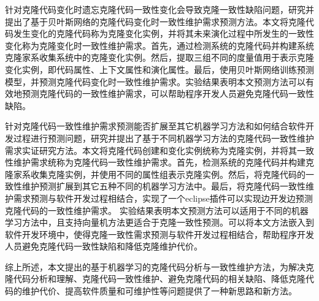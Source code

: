 {%
针对克隆代码变化时遗忘克隆代码一致性变化会导致克隆一致性缺陷问题，研究并提出了基于贝叶斯网络的克隆代码变化时一致性维护需求预测方法。本文将克隆代码发生变化的克隆代码称为克隆变化实例，并将其未来演化过程中所发生的一致性变化称为克隆变化时一致性维护需求。首先，通过检测系统的克隆代码并构建系统克隆家系收集系统中的克隆变化实例。然后，提取三组不同的度量值用于表示克隆变化实例，即代码属性、上下文属性和演化属性。最后，使用贝叶斯网络训练预测模型，并预测克隆代码变化时一致性维护需求。实验结果表明本文预测方法可以有效地预测克隆代码的一致性维护需求，可以帮助程序开发人员避免克隆代码一致性缺陷。


针对克隆代码一致性维护需求预测能否扩展至其它机器学习方法和如何结合软件开发过程进行预测问题，研究并提出了基于不同机器学习方法的克隆代码一致性维护需求实证研究方法。本文将克隆代码创建和变化实例统称为克隆实例，并将其一致性维护需求统称为克隆代码一致性维护需求。首先，检测系统的克隆代码并构建克隆家系收集克隆实例，并使用不同的属性组表示克隆实例。然后，将克隆代码的一致性维护预测扩展到其它五种不同的机器学习方法中。最后，将克隆代码一致性维护需求预测与软件开发过程相结合，实现了一个eclipse插件可以实现边开发边预测克隆代码的一致性维护需求。 实验结果表明本文预测方法可以适用于不同的机器学习方法中，且支持向量机方法更适合于克隆一致性预测。可以将本文方法嵌入到软件开发环境中，使得克隆一致性需求预测与软件开发过程相结合，帮助程序开发人员避免克隆代码一致性缺陷和降低克隆维护代价。%

综上所述，本文提出的基于机器学习的克隆代码分析与一致性维护方法，为解决克隆代码分析和理解、克隆代码一致性维护、避免克隆代码的相关缺陷、降低克隆代码的维护代价、提高软件质量和可维护性等问题提供了一种新思路和新方法。
}


